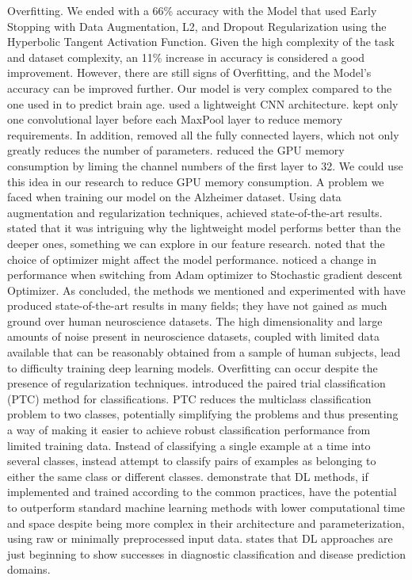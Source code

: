 \documentclass[oneside,12pt,article]{article}
\begin{document}
Overfitting. We ended with a 66\% accuracy with the Model that used Early Stopping with Data Augmentation, L2, and Dropout Regularization using the Hyperbolic Tangent Activation Function. Given the high complexity of the task and dataset complexity, an 11\% increase in accuracy is considered a good improvement. However, there are still signs of Overfitting, and the Model's accuracy can be improved further. Our model is very complex compared to the one used in \cite{peng2021accurate} to predict brain age. \cite{peng2021accurate} used a lightweight CNN architecture. \cite{peng2021accurate} kept only one convolutional layer before each MaxPool layer to reduce memory requirements. In addition, \cite{peng2021accurate} removed all the fully connected layers, which not only greatly reduces the number of parameters. \cite{peng2021accurate} reduced the GPU memory consumption by liming the channel numbers of the first layer to 32. We could use this idea in our research to reduce GPU memory consumption. A problem we faced when training our model on the Alzheimer dataset. Using data augmentation and regularization techniques, \cite{peng2021accurate} achieved state-of-the-art results. \cite{peng2021accurate} stated that it was intriguing why the lightweight model performs better than the deeper ones, something we can explore in our feature research. \cite{peng2021accurate} noted that the choice of optimizer might affect the model performance. \cite{peng2021accurate} noticed a change in performance when switching from Adam optimizer to Stochastic gradient descent Optimizer. As \cite{williams2020paired} concluded, the methods we mentioned and experimented with have produced state-of-the-art results in many fields; they have not gained as much ground over human neuroscience datasets. The high dimensionality and large amounts of noise present in neuroscience datasets, coupled with limited data available that can be reasonably obtained from a sample of human subjects, lead to difficulty training deep learning models. Overfitting can occur despite the presence of regularization techniques. \cite{williams2020paired} introduced the paired trial classification (PTC) method for classifications. PTC reduces the multiclass classification problem to two classes, potentially simplifying the problems and thus presenting a way of making it easier to achieve robust classification performance from limited training data. Instead of classifying a single example at a time into several classes, \cite{williams2020paired} instead attempt to classify pairs of examples as belonging to either the same class or different classes. \cite{abrol2021deep} demonstrate that DL methods, if implemented and trained according to the common practices, have the potential to outperform standard machine learning methods with lower computational time and space despite being more complex in their architecture and parameterization, using raw or minimally preprocessed input data. \cite{abrol2021deep}  states that DL approaches are just beginning to show successes in diagnostic classification and disease prediction domains.
\end{document}
